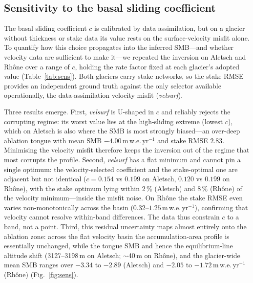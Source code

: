 \subsection{Sensitivity to the basal sliding coefficient}\label{sec:sensitivity} %

The basal sliding coefficient $c$ is calibrated by data assimilation, but on a
glacier without thickness or stake data its value rests on the surface-velocity
misfit alone. To quantify how this choice propagates into the inferred SMB---and
whether velocity data are sufficient to make it---we repeated the inversion on
Aletsch and Rhône over a range of $c$, holding the rate factor fixed at each
glacier's adopted value (Table~\ref{tab:sens}). Both glaciers carry stake
networks, so the stake RMSE provides an independent ground truth against the only
selector available operationally, the data-assimilation velocity misfit
(\emph{velsurf}).

Three results emerge. First, \emph{velsurf} is U-shaped in $c$ and reliably
rejects the corrupting regime: its worst value lies at the high-sliding extreme
(lowest $c$), which on Aletsch is also where the SMB is most strongly biased---an
over-deep ablation tongue with mean SMB $-4.00$\,m\,w.e.\,yr$^{-1}$ and stake
RMSE $2.83$. Minimising the velocity misfit therefore keeps the inversion out of
the regime that most corrupts the profile. Second, \emph{velsurf} has a flat
minimum and cannot pin a single optimum: the velocity-selected coefficient and
the stake-optimal one are adjacent but not identical ($c=0.154$ vs $0.199$ on
Aletsch, $0.120$ vs $0.199$ on Rhône), with the stake optimum lying within
$2\,\%$ (Aletsch) and $8\,\%$ (Rhône) of the velocity minimum---inside the misfit
noise. On Rhône the stake RMSE even varies non-monotonically across the basin
($0.32$--$1.25$\,m\,w.e.\,yr$^{-1}$), confirming that velocity cannot resolve
within-band differences. The data thus constrain $c$ to a band, not a point.
Third, this residual uncertainty maps almost entirely onto the ablation zone:
across the flat velocity basin the accumulation-area profile is essentially
unchanged, while the tongue SMB and hence the equilibrium-line altitude shift
(3127--3198\,m on Aletsch; $\sim$40\,m on Rhône), and the glacier-wide mean SMB
ranges over $-3.34$ to $-2.89$ (Aletsch) and $-2.05$ to $-1.72$\,m\,w.e.\,yr$^{-1}$
(Rhône) (Fig.~\ref{fig:sens}).

